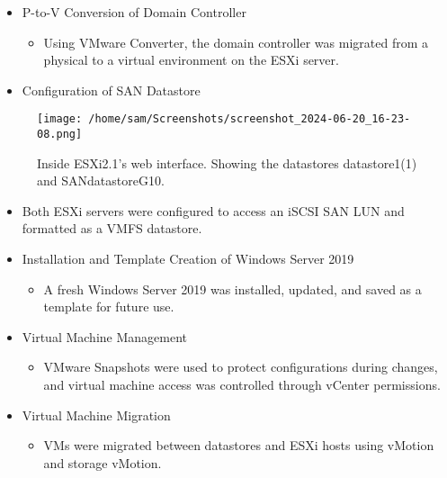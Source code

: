 \documentclass[letterpaper]{article}
\begin{document}
\begin{itemize}
\item P-to-V Conversion of Domain Controller
\begin{itemize}
\item Using VMware Converter, the domain controller was migrated from a physical to a virtual environment on the ESXi server.
\end{itemize}
\item Configuration of SAN Datastore
\end{itemize}
\begin{figure}[H]
\centering
\texttt{[image: /home/sam/Screenshots/screenshot\_2024-06-20\_16-23-08.png]}
\caption{Inside ESXi2.1's web interface. Showing the datastores datastore1(1) and SANdatastoreG10.}
\end{figure}
\begin{itemize}
\item Both ESXi servers were configured to access an iSCSI SAN LUN and formatted as a VMFS datastore.
\end{itemize}
\begin{itemize}
\item Installation and Template Creation of Windows Server 2019
\begin{itemize}
\item A fresh Windows Server 2019 was installed, updated, and saved as a template for future use.
\end{itemize}
\item Virtual Machine Management
\begin{itemize}
\item VMware Snapshots were used to protect configurations during changes, and virtual machine access was controlled through vCenter permissions.
\end{itemize}
\item Virtual Machine Migration
\begin{itemize}
\item VMs were migrated between datastores and ESXi hosts using vMotion and storage vMotion.
\end{itemize}
\end{itemize}
\end{document}
